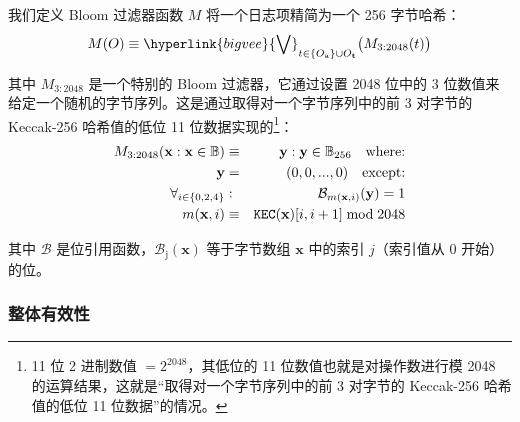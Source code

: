 \documentclass[9pt,oneside]{amsart}
\begin{document}
\begin{multicols}{2}
我们定义 Bloom 过滤器函数 $M$ 将一个日志项精简为一个 256 字节哈希：
\begin{equation}
M(O) \equiv \hyperlink{bigvee}{\bigvee}_{t \in \{O_{\mathrm{a}}\} \cup O_{\mathbf{t}}} \big( M_{3:2048}(t) \big)
\end{equation}

其中 $M_{3:2048}$ 是一个特别的 Bloom 过滤器，它通过设置 2048 位中的 3 位数值来给定一个随机的字节序列。这是通过取得对一个字节序列中的前 3 对字节的 Keccak-256 哈希值的低位 11 位数据实现的\footnote{11 位 2 进制数值 $= 2^{2048}$，其低位的 11 位数值也就是对操作数进行模 2048 的运算结果，这就是“取得对一个字节序列中的前 3 对字节的 Keccak-256 哈希值的低位 11 位数据”的情况。}：
\begin{eqnarray}
M_{3:2048}(\mathbf{x}: \mathbf{x} \in \mathbb{B}) & \equiv & \mathbf{y}: \mathbf{y} \in \mathbb{B}_{256} \quad \text{where:}\\
\mathbf{y} & = & (0, 0, ..., 0) \quad \text{except:}\\
\forall_{i \in \{0, 2, 4\}}&:& \mathcal{B}_{m(\mathbf{x}, i)}(\mathbf{y}) = 1\\
m(\mathbf{x}, i) &\equiv& \mathtt{\tiny KEC}(\mathbf{x})[i, i + 1] \bmod 2048
\end{eqnarray}

其中 $\mathcal{B}$ 是位引用函数，$\mathcal{B}_{\mathrm{j}}(\mathbf{x})$ 等于字节数组 $\mathbf{x}$ 中的索引 $j$（索引值从 0 开始）的位。

\subsubsection{整体有效性}


\end{multicols}
\end{document}
